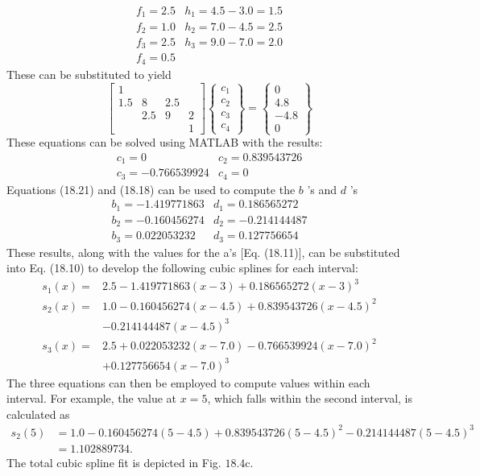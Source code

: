 \documentclass[../main.tex]{subfiles}
\begin{document}
\begin{exmp}
    $$
    \begin{array}{ll}
    f_{1}=2.5 & h_{1}=4.5-3.0=1.5 \\
    f_{2}=1.0 & h_{2}=7.0-4.5=2.5 \\
    f_{3}=2.5 & h_{3}=9.0-7.0=2.0 \\
    f_{4}=0.5 &
    \end{array}
    $$
    These can be substituted to yield
    $$
    \left[\begin{array}{cccc}
    1 & & & \\
    1.5 & 8 & 2.5 & \\
    & 2.5 & 9 & 2 \\
    & & & 1
    \end{array}\right]\left\{\begin{array}{l}
    c_{1} \\
    c_{2} \\
    c_{3} \\
    c_{4}
    \end{array}\right\}=\left\{\begin{array}{c}
    0 \\
    4.8 \\
    -4.8 \\
    0
    \end{array}\right\}
    $$
    These equations can be solved using MATLAB with the results:
    $$
    \begin{array}{ll}
    c_{1}=0 & c_{2}=0.839543726 \\
    c_{3}=-0.766539924 & c_{4}=0
    \end{array}
    $$
    Equations (18.21) and (18.18) can be used to compute the $b$ 's and $d$ 's
    $$
    \begin{array}{ll}
    b_{1}=-1.419771863 & d_{1}=0.186565272 \\
    b_{2}=-0.160456274 & d_{2}=-0.214144487 \\
    b_{3}=0.022053232 & d_{3}=0.127756654
    \end{array}
    $$
    These results, along with the values for the a's [Eq. (18.11)], can be substituted into Eq. (18.10) to develop the following cubic splines for each interval:
    $$
    \begin{aligned}
    s_{1}(x)=& 2.5-1.419771863(x-3)+0.186565272(x-3)^{3} \\
    s_{2}(x)=& 1.0-0.160456274(x-4.5)+0.839543726(x-4.5)^{2} \\
    &-0.214144487(x-4.5)^{3} \\
    s_{3}(x)=& 2.5+0.022053232(x-7.0)-0.766539924(x-7.0)^{2} \\
    &+0.127756654(x-7.0)^{3}
    \end{aligned}
    $$
    The three equations can then be employed to compute values within each interval. For example, the value at $x=5$, which falls within the second interval, is calculated as
    $$
    \begin{aligned}
    s_{2}(5) &=1.0-0.160456274(5-4.5)+0.839543726(5-4.5)^{2}-0.214144487(5-4.5)^{3} \\
    &=1.102889734 .
    \end{aligned}
    $$
    The total cubic spline fit is depicted in Fig. $18.4 \mathrm{c}$.


\end{exmp}
\end{document}
